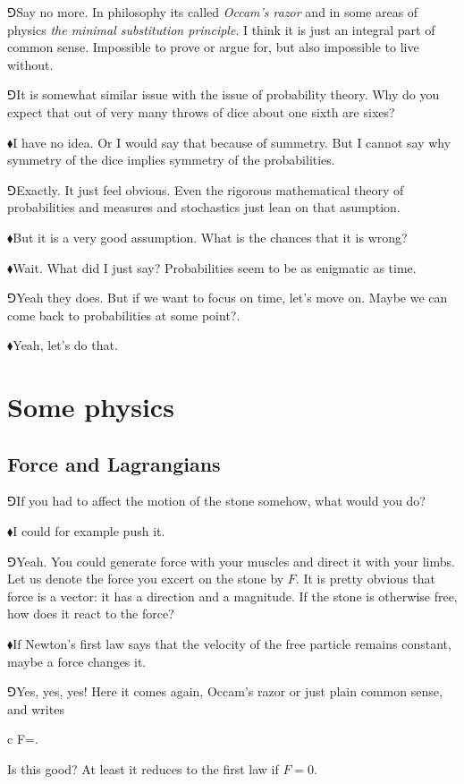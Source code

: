 \documentclass[10pt,oneside%
]{memoir}
\newenvironment{eqna}{\begin{IEEEeqnarray*}{c}}{\end{IEEEeqnarray*}\ignorespacesafterend}
\newcommand{\hea}{\(\blacklozenge\)\;}
\newcommand{\heb}{\(\Game\)\;}
\begin{document}
\heb Say no more. In philosophy its called \emph{Occam's razor} and in some areas of physics \emph{the minimal substitution principle}. I think it is just an integral part of common sense. Impossible to prove or argue for, but also impossible to live without.

\heb It is somewhat similar issue with the issue of probability theory. Why do you expect that out of very many throws of dice about one sixth are sixes?

\hea I have no idea. Or I would say that because of summetry. But I cannot say why symmetry of the dice implies symmetry of the probabilities.

\heb Exactly. It just feel obvious. Even the rigorous mathematical theory of probabilities and measures and stochastics just lean on that asumption.

\hea But it is a very good assumption. What is the chances that it is wrong?

\hea Wait. What did I just say? Probabilities seem to be as enigmatic as time.

\heb Yeah they does. But if we want to focus on time, let's move on. Maybe we can come back to probabilities at some point?.

\hea Yeah, let's do that.
\chapter{Some physics}
\section{Force and Lagrangians}
\heb If you had to affect the motion of the stone somehow, what would you do?

\hea I could for example push it.

\heb Yeah. You could generate force with your muscles and direct it with your limbs. Let us denote the force you excert on the stone by \(F\). It is pretty obvious that force is a vector: it has a direction and a magnitude. If the stone is otherwise free, how does it react to the force?

\hea If Newton's first law says that the velocity of the free particle remains constant, maybe a force changes it.

\heb Yes, yes, yes! Here it comes again, Occam's razor or just plain common sense, and writes
\begin{eqna}
    F=.
\end{eqna}
Is this good? At least it reduces to the first law if \(F=0\).
\end{document}
